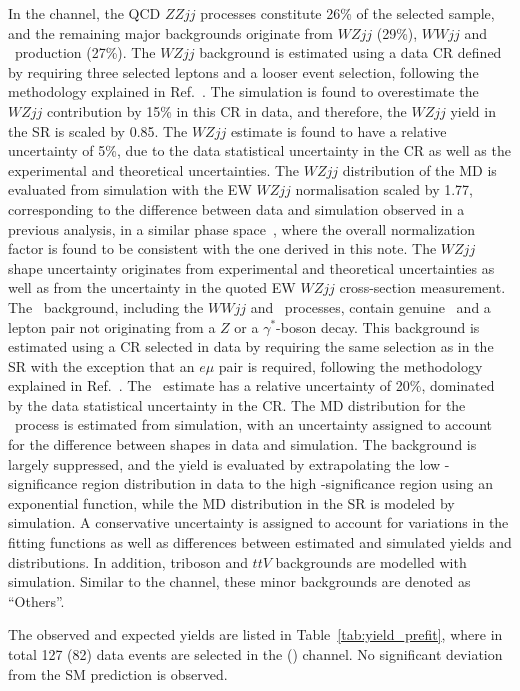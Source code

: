 In the \llvvjj channel, the QCD $ZZjj$ processes constitute 26\% of the selected sample,
and the remaining major backgrounds originate from $WZjj$ (29\%), $WWjj$ and \ttbar~production (27\%).
The $WZjj$ background is estimated using a data CR defined by requiring three selected leptons and a looser event selection, following the methodology explained in Ref.~\cite{Aaboud:2017bja}.
The simulation is found to overestimate the $WZjj$ contribution by 15\% in this CR in data,
and therefore, the $WZjj$ yield in the SR is scaled by 0.85.
The $WZjj$ estimate is found to have a relative uncertainty of 5\%, due to the data statistical uncertainty in the CR as well as the experimental and theoretical uncertainties.
The $WZjj$ distribution of the MD is evaluated from simulation with the EW $WZjj$ normalisation scaled by 1.77, corresponding to the difference between data and simulation observed in a previous analysis, in a similar phase space~\cite{Aaboud:2018ddq},
where the overall normalization factor is found to be consistent with the one derived in this note.
The $WZjj$ shape uncertainty originates from experimental and theoretical uncertainties as well as from the uncertainty in the quoted EW $WZjj$ cross-section measurement.
The \nonresll~background, including the $WWjj$ and \ttbar~processes, contain genuine \met~and a lepton pair not originating from a $Z$ or a $\gamma^{*}$-boson decay.
This background is estimated using a CR selected in data by requiring the same selection as in the SR with the exception that an $e\mu$ pair is required, following the methodology explained in Ref.~\cite{Aaboud:2017bja}.
The \nonresll~estimate has a relative uncertainty of 20\%, dominated by the data statistical uncertainty in the CR.
The MD distribution for the \nonresll~process is estimated from simulation,
with an uncertainty assigned to account for the difference between shapes in data and simulation.
The \Zjet background is largely suppressed, and the yield is evaluated by extrapolating the low \met-significance region distribution in data to the high \met-significance region using an exponential function,
while the MD distribution in the SR is modeled by simulation.
A conservative uncertainty is assigned to account for variations in the fitting functions as well as differences between estimated and simulated yields and distributions.
In addition, triboson and $ttV$ backgrounds are modelled with simulation. Similar to the \lllljj channel, these minor backgrounds are denoted as ``Others''.

The observed and expected yields are listed in Table~\ref{tab:yield_prefit},
where in total 127 (82) data events are selected in the \lllljj (\llvvjj) channel.
No significant deviation from the SM prediction is observed.


